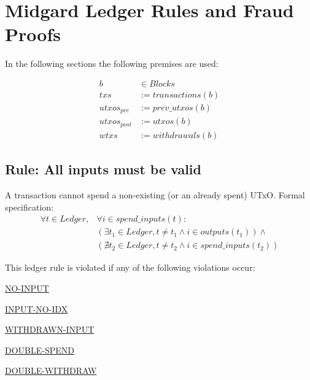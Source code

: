 \documentclass[../midgard.tex]{subfiles}
\begin{document}
\section{Midgard Ledger Rules and Fraud Proofs}
\label{h:ledger-rules-fraud-proofs}

In the following sections the following premises are used:

\begin{equation*}
\begin{split}
           b & \in Blocks          \\
         txs & := transactions(b)  \\
 utxos_{pre} & := prev\_utxos(b)   \\
utxos_{post} & := utxos(b)         \\
        wtxs & := withdrawals(b)
\end{split}
\end{equation*}

\subsection{Rule: All inputs must be valid}
\label{rule:all-inputs-must-be-valid}

A transaction cannot spend a non-existing (or an already spent) UTxO. Formal specification:
\begin{equation*}
\begin{split}
    \forall t \in Ledger, &\forall i \in spend\_inputs(t): \\
    &( \exists t_1 \in Ledger, t \neq t_1 \land i \in outputs(t_1) ) \land \\
    &( \nexists t_2 \in Ledger, t \neq t_2 \land i \in spend\_inputs(t_2) )
\end{split}
\end{equation*}

This ledger rule is violated if any of the following violations occur:
\begin{itemize-multi}
  \item \hyperref[violation:NO-INPUT]{NO-INPUT}
  \item \hyperref[violation:INPUT-NO-IDX]{INPUT-NO-IDX}
  \item \hyperref[violation:WITHDRAWN-INPUT]{WITHDRAWN-INPUT}
  \item \hyperref[violation:DOUBLE-SPEND]{DOUBLE-SPEND}
  \item \hyperref[violation:DOUBLE-WITHDRAW]{DOUBLE-WITHDRAW}
\end{itemize-multi}
\end{document}
